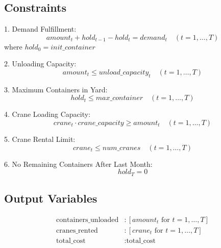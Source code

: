 \documentclass{article}
\begin{document}
\subsection*{Constraints}
1. Demand Fulfillment:
\[
amount_{t} + hold_{t-1} - hold_{t} = demand_{t} \quad (t = 1, \ldots, T)
\]
where \( hold_{0} = init\_container \)

2. Unloading Capacity:
\[
amount_{t} \leq unload\_capacity_{t} \quad (t = 1, \ldots, T)
\]

3. Maximum Containers in Yard:
\[
hold_{t} \leq max\_container \quad (t = 1, \ldots, T)
\]

4. Crane Loading Capacity:
\[
crane_{t} \cdot crane\_capacity \geq amount_{t} \quad (t = 1, \ldots, T)
\]

5. Crane Rental Limit:
\[
crane_{t} \leq num\_cranes \quad (t = 1, \ldots, T)
\]

6. No Remaining Containers After Last Month:
\[
hold_{T} = 0
\]

\subsection*{Output Variables}
\begin{align*}
\text{containers\_unloaded} & : [amount_{t} \text{ for } t = 1, \ldots, T] \\
\text{cranes\_rented} & : [crane_{t} \text{ for } t = 1, \ldots, T] \\
\text{total\_cost} & : \text{total\_cost}
\end{align*}
\end{document}
